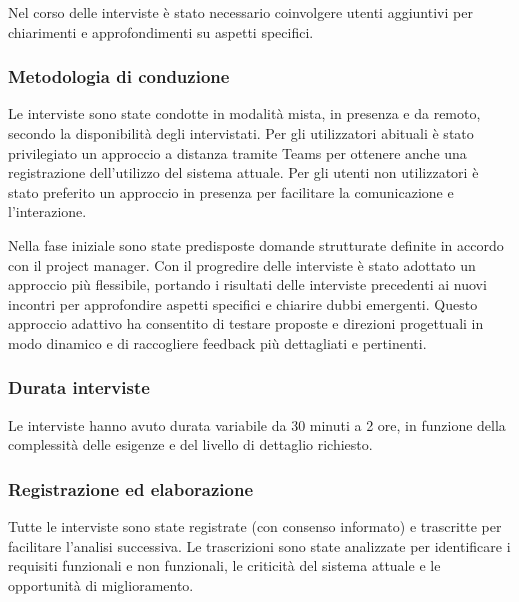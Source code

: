 \documentclass[12pt, a4paper]{article}
\begin{document}
Nel corso delle interviste è stato necessario coinvolgere utenti aggiuntivi per chiarimenti e approfondimenti su aspetti specifici.

\subsubsection{Metodologia di conduzione}
Le interviste sono state condotte in modalità mista, in presenza e da remoto, secondo la disponibilità degli intervistati.
Per gli utilizzatori abituali è stato privilegiato un approccio a distanza tramite Teams per ottenere anche una registrazione dell'utilizzo del sistema attuale.
Per gli utenti non utilizzatori è stato preferito un approccio in presenza per facilitare la comunicazione e l'interazione.

Nella fase iniziale sono state predisposte domande strutturate definite in accordo con il project manager.
Con il progredire delle interviste è stato adottato un approccio più flessibile, portando i risultati delle interviste precedenti ai nuovi incontri per approfondire aspetti specifici e chiarire dubbi emergenti.
Questo approccio adattivo ha consentito di testare proposte e direzioni progettuali in modo dinamico e di raccogliere feedback più dettagliati e pertinenti.

\subsubsection{Durata interviste}
Le interviste hanno avuto durata variabile da 30 minuti a 2 ore, in funzione della complessità delle esigenze e del livello di dettaglio richiesto.

\subsubsection{Registrazione ed elaborazione}
Tutte le interviste sono state registrate (con consenso informato) e trascritte per facilitare l'analisi successiva.
Le trascrizioni sono state analizzate per identificare i requisiti funzionali e non funzionali, le criticità del sistema attuale e le opportunità di miglioramento.
\end{document}
